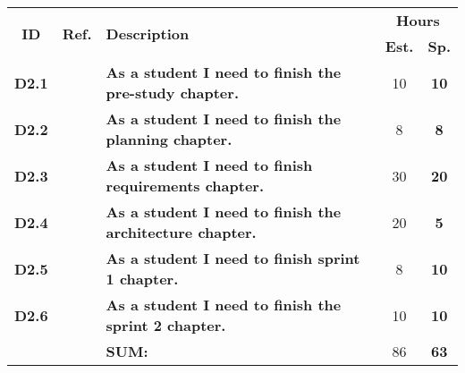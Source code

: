 \label{tab:sprint2Documentationstories}
\def\arraystretch{1.25}
 
\begin{longtable}{ccXcc}

\toprule[0.5mm]
\multirow{2}{*}{\textbf{ID}} &
\multirow{2}{*}{\textbf{Ref.}} & \multirow{2}{*}{\textbf{Description}} & \multicolumn{2}{c}{\textbf{Hours}} \\
 					& & & \textbf{Est.} & \textbf{Sp.} \\
\midrule


\textbf{D2.1} 	& 	& {\bf As a student I need to finish the pre-study chapter.} 									& 	10	& \textbf{ 10} \\

\textbf{D2.2} 	& 	& {\bf As a student I need to finish the planning chapter.} 									& 	8	& \textbf{ 8} \\

\textbf{D2.3} 	& 	& {\bf As a student I need to finish requirements chapter.} 									& 	30	& \textbf{ 20} \\

\textbf{D2.4} 	&   & {\bf As a student I need to finish the architecture chapter.} 								& 	20	& \textbf{ 5} \\

\textbf{D2.5} 	& 	& {\bf As a student I need to finish sprint 1 chapter.} 										& 	8	& \textbf{ 10} \\

\textbf{D2.6} 	& 	& {\bf As a student I need to finish the  sprint 2 chapter.} 									& 	10	& \textbf{ 10} \\

								
\hline
				&& \textbf{SUM:}		&		86	& \textbf{63}
 \\																			
\bottomrule[0.5mm]
\end{longtable}
